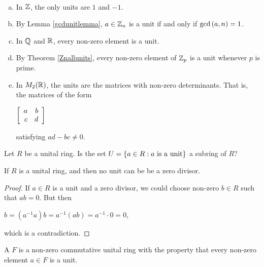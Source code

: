 \documentclass[11pt,fleqn,dvipsnames,usenames]{article}
\begin{document}
%
\begin{examples}~
\begin{enumerate}[(a)]
\item In $\Z$, the only units are $1$ and $-1$.
\item By Lemma \ref{gcdunitlemma}, $a\in \ZN$ is a unit if and only if $\GCD{a,n} = 1$.
\item In $\RATIONAL$ and $\REAL$, every non-zero element is a unit.
\item By Theorem \ref{Znallunits}, every non-zero element of $\Z_p$ is a unit whenever $p$ is prime.
\item In $M_{2}(\REAL)$, the units are the matrices with non-zero determinants.  That is, the matrices of the form
\begin{center}
$\MATRIX{rr}{a & b\\c & d}$
\end{center}
satisfying $ad - bc \neq 0$.
\end{enumerate}
\end{examples}
%
\begin{exercise}
Let $R$ be a unital ring.  Is the set $U=\SET{a\in R:a\text{ is a unit}}$ a subring of $R$?
\end{exercise}
%
\begin{lemma}\label{unitscantbezerodivisors}
If $R$ is a unital ring, and then no unit can be be a zero divisor.
\end{lemma}
%
\begin{proof}
If $a\in R$ is a unit and a zero divisor, we could choose non-zero $b\in R$ such that $ab = 0$.  But then
\begin{center}
$b = (a^{-1}a)b = a^{-1}(ab) = a^{-1}\cdot 0 = 0$,
\end{center}
which is a contradiction.
\end{proof}
%
\begin{definition}
A  $F$ is a non-zero commutative unital ring with the property that every non-zero element $a\in F$ is a unit.
\end{definition}
%
\end{document}
